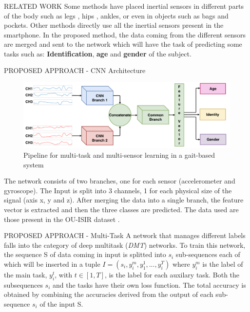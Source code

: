 \documentclass[10pt]{beamer}
\begin{document}
\begin{frame}{RELATED WORK}
    Some methods have placed inertial sensors in different parts of the body 
    such as legs , hips , ankles, or even in objects such as bags and 
    pockets. Other methods  directly use all the inertial sensors present in 
    the smartphone. In the proposed method, the data coming from the 
    different sensors are merged and sent to the network which will have the 
    task of predicting some tasks such as: {\bfseries{Identification}}, {\bfseries{age}} and {\bfseries{gender}} of 
    the subject.
\end{frame}

\begin{frame}{PROPOSED APPROACH - CNN Architecture}
    \begin{figure}[htbp]
        \centering
        \includegraphics[width = 0.8 \linewidth]{images/paper5/architecture.png}
        \centering
        \caption{Pipeline for multi-task and multi-sensor learning in a gait-based system}
        \label{fig:pipeline}
    \end{figure}
    The network consists of two branches, one for each sensor (accelerometer 
    and gyroscope). The Input is split into 3 channels, 1 for each physical 
    size of the signal (axis x, y and z). After merging the data into a single 
    branch, the feature vector is extracted and then the three classes are 
    predicted. The data used are those present in the OU-ISIR dataset \small{}.
\end{frame}

\begin{frame}{PROPOSED APPROACH - Multi-Task}
    A network that manages different labels falls into the category of deep 
    multitask (\emph{DMT}) networks. To train this network, the sequence S of data 
    coming in input is splitted into $ s_i $ sub-sequences each of which will be 
    inserted in a tuple $ I = (s_i, y_i^m, y_1^1, ..., y_i^T) $ where $ y_i^m $ is the label of the 
    main task, $ y_i^t $, with $ t \in [1,T] $, is the label for each auxilary task. Both 
    the subsequences $ s_i $ and the tasks have their own loss function. The  total  
    accuracy  is  obtained  by combining the accuracies derived from the output 
    of each sub-sequence $ s_i $  of  the  input  S.
\end{frame}
\end{document}
